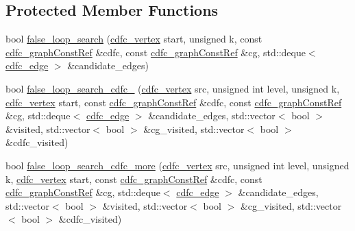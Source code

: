 \subsection*{Protected Member Functions}
\begin{DoxyCompactItemize}
\item 
bool \hyperlink{classcdfc__module__binding_add730ae5e58ed2343e103075cb0c6b12}{false\+\_\+loop\+\_\+search} (\hyperlink{cdfc__module__binding_8hpp_affa85aa857f7ad00e0ed52c20fcd863b}{cdfc\+\_\+vertex} start, unsigned k, const \hyperlink{cdfc__module__binding_8hpp_a3f94e2158e9a11882a35140b0365f1ad}{cdfc\+\_\+graph\+Const\+Ref} \&cdfc, const \hyperlink{cdfc__module__binding_8hpp_a3f94e2158e9a11882a35140b0365f1ad}{cdfc\+\_\+graph\+Const\+Ref} \&cg, std\+::deque$<$ \hyperlink{cdfc__module__binding_8hpp_a5ef126c5daeb3e4b387d23088ebce43e}{cdfc\+\_\+edge} $>$ \&candidate\+\_\+edges)
\item 
bool \hyperlink{classcdfc__module__binding_a4979eecd53066cce0234ab4d42bca3a0}{false\+\_\+loop\+\_\+search\+\_\+cdfc\+\_} (\hyperlink{cdfc__module__binding_8hpp_affa85aa857f7ad00e0ed52c20fcd863b}{cdfc\+\_\+vertex} src, unsigned int level, unsigned k, \hyperlink{cdfc__module__binding_8hpp_affa85aa857f7ad00e0ed52c20fcd863b}{cdfc\+\_\+vertex} start, const \hyperlink{cdfc__module__binding_8hpp_a3f94e2158e9a11882a35140b0365f1ad}{cdfc\+\_\+graph\+Const\+Ref} \&cdfc, const \hyperlink{cdfc__module__binding_8hpp_a3f94e2158e9a11882a35140b0365f1ad}{cdfc\+\_\+graph\+Const\+Ref} \&cg, std\+::deque$<$ \hyperlink{cdfc__module__binding_8hpp_a5ef126c5daeb3e4b387d23088ebce43e}{cdfc\+\_\+edge} $>$ \&candidate\+\_\+edges, std\+::vector$<$ bool $>$ \&visited, std\+::vector$<$ bool $>$ \&cg\+\_\+visited, std\+::vector$<$ bool $>$ \&cdfc\+\_\+visited)
\item 
bool \hyperlink{classcdfc__module__binding_a8bc1294bc28ba788416147655ac1d17c}{false\+\_\+loop\+\_\+search\+\_\+cdfc\+\_\+more} (\hyperlink{cdfc__module__binding_8hpp_affa85aa857f7ad00e0ed52c20fcd863b}{cdfc\+\_\+vertex} src, unsigned int level, unsigned k, \hyperlink{cdfc__module__binding_8hpp_affa85aa857f7ad00e0ed52c20fcd863b}{cdfc\+\_\+vertex} start, const \hyperlink{cdfc__module__binding_8hpp_a3f94e2158e9a11882a35140b0365f1ad}{cdfc\+\_\+graph\+Const\+Ref} \&cdfc, const \hyperlink{cdfc__module__binding_8hpp_a3f94e2158e9a11882a35140b0365f1ad}{cdfc\+\_\+graph\+Const\+Ref} \&cg, std\+::deque$<$ \hyperlink{cdfc__module__binding_8hpp_a5ef126c5daeb3e4b387d23088ebce43e}{cdfc\+\_\+edge} $>$ \&candidate\+\_\+edges, std\+::vector$<$ bool $>$ \&visited, std\+::vector$<$ bool $>$ \&cg\+\_\+visited, std\+::vector$<$ bool $>$ \&cdfc\+\_\+visited)

\end{DoxyCompactItemize}
